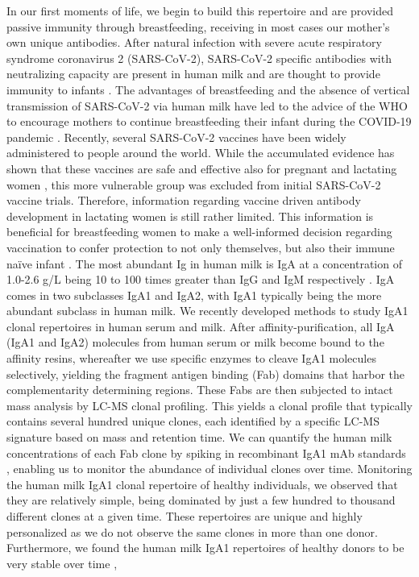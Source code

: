 In our first moments of life, we begin to build this repertoire and are provided passive immunity through breastfeeding, receiving in most cases our mother’s own unique antibodies. After natural infection with severe acute respiratory syndrome coronavirus 2 (SARS-CoV-2), SARS-CoV-2 specific antibodies with neutralizing capacity are present in human milk and are thought to provide immunity to infants \cite{dong2020antibodies, fox2020robust, pace2021characterization, keulen2021human, bode2022characterization, lebrão2020early, juncker2021human}. The advantages of breastfeeding and the absence of vertical transmission of SARS-CoV-2 via human milk \cite{dong2020antibodies, pace2021characterization, kumar2022sars-cov-, krogstad2021no, chambers2020evaluation} have led to the advice of the WHO to encourage mothers to continue breastfeeding their infant during the COVID-19 pandemic \cite{organization2020breastfeeding}. Recently, several SARS-CoV-2 vaccines have been widely administered to people around the world. While the accumulated evidence has shown that these vaccines are safe and effective also for pregnant and lactating women \cite{juncker2021comparison, zilver2023vaccination, fu2022systematic, jamieson2022update, shimabukuro2021preliminary, falsaperla2021covid-}, this more vulnerable group was excluded from initial SARS-CoV-2 vaccine trials. Therefore, information regarding vaccine driven antibody development in lactating women is still rather limited. This information is beneficial for breastfeeding women to make a well-informed decision regarding vaccination to confer protection to not only themselves, but also their immune naïve infant \cite{simon2015evolution}. The most abundant Ig in human milk is IgA at a concentration of 1.0-2.6 g/L being 10 to 100 times greater than IgG and IgM respectively \cite{czosnykowska-łukacka2020changes, lönnerdal2017longitudinal}. IgA comes in two subclasses IgA1 and IgA2, with IgA1 typically being the more abundant subclass in human milk. We recently developed methods to study IgA1 clonal repertoires in human serum and milk. After affinity-purification, all IgA (IgA1 and IgA2) molecules from human serum or milk \cite{bondt2021direct, dingess2023identification} become bound to the affinity resins, whereafter we use specific enzymes to cleave IgA1 molecules selectively, yielding the fragment antigen binding (Fab) domains that harbor the complementarity determining regions. These Fabs are then subjected to intact mass analysis by LC-MS clonal profiling. This yields a clonal profile that typically contains several hundred unique clones, each identified by a specific LC-MS signature based on mass and retention time. We can quantify the human milk concentrations of each Fab clone by spiking in recombinant IgA1 mAb standards \cite{bondt2021direct}, enabling us to monitor the abundance of individual clones over time. Monitoring the human milk IgA1 clonal repertoire of healthy individuals, we observed that they are relatively simple, being dominated by just a few hundred to thousand different clones at a given time. These repertoires are unique and highly personalized as we do not observe the same clones in more than one donor. Furthermore, we found the human milk IgA1 repertoires of healthy donors to be very stable over time \cite{bondt2021direct}, 